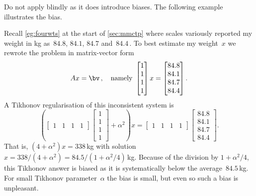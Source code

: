 \begin{activity}
\end{activity}



Do not apply  blindly as it does introduce biases. 
The following example illustrates the bias.

\begin{example} \label{eg:}
Recall \autoref{eg:fourwts} at the start of \autoref{sec:mmctp} where  scales variously reported my weight in kg as~\(84.8\), \(84.1\), \(84.7\) and~\(84.4\)\,.  
To best estimate my weight~\(x\) we rewrote the problem in matrix-vector form
\begin{equation*}
Ax=\bv\,,\quad\text{namely }
\begin{bmatrix} 1\\1\\1\\1 \end{bmatrix}x
=\begin{bmatrix} 84.8\\84.1\\84.7\\84.4 \end{bmatrix}.
\end{equation*}
A Tikhonov regularisation of this inconsistent system is
\begin{equation*}
\left(\begin{bmatrix} 1&1&1&1 \end{bmatrix}\begin{bmatrix} 1\\1\\1\\1 \end{bmatrix}+\alpha^2\right)x
=\begin{bmatrix} 1&1&1&1 \end{bmatrix}\begin{bmatrix} 84.8\\84.1\\84.7\\84.4 \end{bmatrix}.
\end{equation*}
That is, \((4+\alpha^2)x=338\)\,kg with solution \(x=338/(4+\alpha^2)=84.5/(1+\alpha^2/4)\)\,kg.
Because of the division by \(1+\alpha^2/4\), this Tikhonov answer is biased as it is systematically below the average~\(84.5\)\,kg.
For small Tikhonov parameter~\(\alpha\) the bias is small, but even so such a bias is unpleasant.
\end{example}



